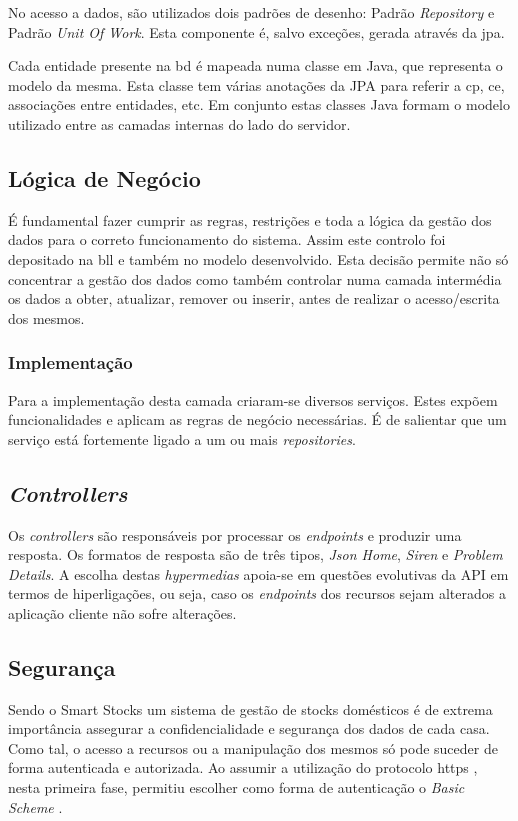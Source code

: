 No acesso a dados, são utilizados dois padrões de desenho: Padrão \textit{Repository} e Padrão \textit{Unit Of Work}. Esta componente é, salvo exceções, gerada através da \acrshort{jpa}.

Cada entidade presente na \acrshort{bd} é mapeada numa classe em Java, que representa o modelo da mesma. Esta classe tem várias anotações da JPA para referir a \acrlong{cp}, \acrlong{ce}, associações entre entidades, etc. Em conjunto estas classes Java formam o modelo utilizado entre as camadas internas do lado do servidor.

%
%
\subsection{Lógica de Negócio}\label{subsec422}

É fundamental fazer cumprir as regras, restrições e toda a lógica da gestão dos dados para o correto funcionamento do sistema. Assim  este controlo foi depositado na \acrfull{bll} e também no modelo desenvolvido. Esta decisão permite não só concentrar a gestão dos dados como também controlar numa camada intermédia os dados a obter, atualizar, remover ou inserir, antes de realizar o acesso/escrita dos mesmos. 

\subsubsection{Implementação}\label{subsubsec4221}

Para a implementação desta camada criaram-se diversos serviços. Estes expõem funcionalidades e aplicam as regras de negócio necessárias. É de salientar que um serviço está fortemente ligado a um ou mais \textit{repositories}.

%
%
\subsection{\textit{Controllers}}\label{subsec423}

Os \textit{controllers} são responsáveis por processar os \textit{endpoints} e produzir uma resposta. Os formatos de resposta são de três tipos, \textit{Json Home}, \textit{Siren} e \textit{Problem Details}. A escolha destas \textit{hypermedias} apoia-se em questões evolutivas da API em termos de hiperligações, ou seja, caso os \textit{endpoints} dos recursos sejam alterados a aplicação cliente não sofre alterações.

%
%
\subsection{Segurança}\label{subsec424}

Sendo o Smart Stocks um sistema de gestão de stocks domésticos é de extrema importância assegurar a confidencialidade e segurança dos dados de cada casa. Como tal, o acesso a recursos ou a manipulação dos mesmos só pode suceder de forma autenticada e autorizada. Ao assumir a utilização do protocolo \acrfull{https} \cite{RFC2660:https}, nesta primeira fase, permitiu escolher como forma de autenticação o \textit{Basic Scheme} \cite{RFC7617:basicSheme} .


